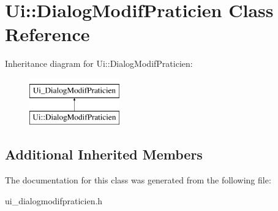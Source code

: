 \hypertarget{classUi_1_1DialogModifPraticien}{\section{Ui\-:\-:Dialog\-Modif\-Praticien Class Reference}
\label{classUi_1_1DialogModifPraticien}
}
Inheritance diagram for Ui\-:\-:Dialog\-Modif\-Praticien\-:\begin{figure}[H]
\begin{center}
\leavevmode
\includegraphics[height=2.000000cm]{classUi_1_1DialogModifPraticien}
\end{center}
\end{figure}
\subsection*{Additional Inherited Members}


The documentation for this class was generated from the following file\-:\begin{DoxyCompactItemize}
\item 
ui\-\_\-dialogmodifpraticien.\-h\end{DoxyCompactItemize}
